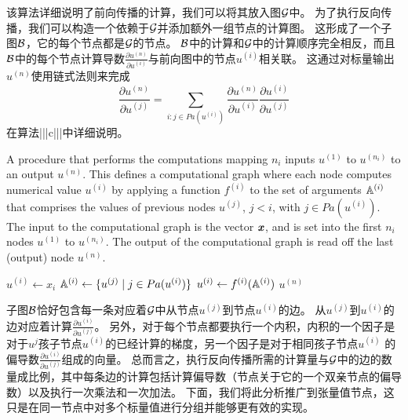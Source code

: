 该算法详细说明了前向传播的计算，我们可以将其放入图$\mathcal{G}$中。
为了执行反向传播，我们可以构造一个依赖于$\mathcal{G}$并添加额外一组节点的计算图。
这形成了一个子图$\mathcal{B}$，它的每个节点都是$\mathcal{G}$的节点。
$\mathcal{B}$中的计算和$\mathcal{G}$中的计算顺序完全相反，而且$\mathcal{B}$中的每个节点计算导数$\frac{\partial u^{(n)}}{\partial u^{(i)}}$与前向图中的节点$u^{(i)}$相关联。
这通过对标量输出$u^{(n)}$使用链式法则来完成
\begin{equation}
  \frac{\partial u^{(n)}}{\partial u^{(j)}} = \sum_{i:j \in Pa(u^{(i)})} \frac{\partial u^{(n)} }{ \partial u^{(i)} } \frac{ \partial u^{(i)} }{ \partial u^{(j)} }
  \label{eq:6.49}
\end{equation}
在算法|||c|||中详细说明。
\begin{algorithm}[htbp]
  \caption{A procedure that performs the computations
    mapping $n_i$ inputs $u^{(1)}$ to $u^{(n_i)}$ to an output $u^{(n)}$.
    This defines a computational graph where each node computes numerical
value $u^{(i)}$ by applying a function $f^{(i)}$ to the set of arguments $\mathbb{A}^{(i)}$ that comprises the values
of previous nodes $u^{(j)}$, $j<i$, with $j \in Pa(u^{(i)})$.
The input to the computational graph is the vector $\boldsymbol{\mathit{x}}$, and is set into the first $n_i$ nodes $u^{(1)}$ to $u^{(n_i)}$.
The output of the computational graph is read off the last (output) node $u^{(n)}$.}
\label{alg:fprop}
\begin{algorithmic}
 \STATE $u^{(i)} \leftarrow x_i$
\ENDFOR
{}
 \STATE $\mathbb{A}^{(i)} \leftarrow \{ u^{(j)} \mid j \in Pa(u^{(i)}) \}$
 \STATE $u^{(i)} \leftarrow f^{(i)}(\mathbb{A}^{(i)})$
\ENDFOR
{} $u^{(n)}$
\end{algorithmic}
\end{algorithm}
子图$\mathcal{B}$恰好包含每一条对应着$\mathcal{G}$中从节点$u^{(j)}$到节点$u^{(i)}$的边。
从$u^{(j)}$到$u^{(i)}$的边对应着计算$\frac{\partial u^{(i)}}{\partial u^{(j)}}$。
另外，对于每个节点都要执行一个内积，内积的一个因子是对于$u^{j}$孩子节点$u^{(i)}$的已经计算的梯度，另一个因子是对于相同孩子节点$u^{(i)}$ 的偏导数$\frac{\partial u^{(i)}}{\partial u^{(j)}}$组成的向量。
总而言之，执行反向传播所需的计算量与$\mathcal{G}$中的边的数量成比例，其中每条边的计算包括计算偏导数（节点关于它的一个双亲节点的偏导数）以及执行一次乘法和一次加法。
下面，我们将此分析推广到张量值节点，这只是在同一节点中对多个标量值进行分组并能够更有效的实现。

